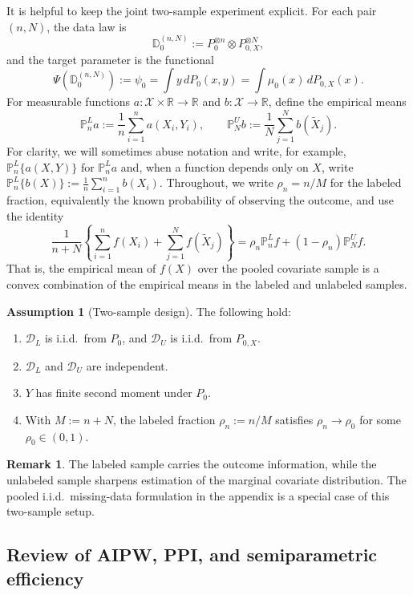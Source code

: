 \documentclass{article}
\theoremstyle{plain}
\theoremstyle{definition}
\newtheorem{remark}{Remark}
\newtheorem{assumption}{Assumption}
\newcommand{\R}{\mathbb{R}}
\newcommand{\1}{\mathbbm{1}}
\newcommand{\rhozero}{\rho_0}
\newcommand{\rhon}{\rho_n}
\newcommand{\muzero}{\mu_0}
\newcommand{\Pl}{\mathbb{P}^{L}_n}
\newcommand{\Pu}{\mathbb{P}^{U}_N}
\newcommand{\Px}{P_{0,X}}
\begin{document}
It is helpful to keep the joint two-sample experiment explicit. For each pair \((n,N)\), the data law is
\[
\mathbb D_0^{(n,N)} := P_0^{\otimes n}\otimes \Px^{\otimes N},
\]
and the target parameter is the functional
\[
\Psi\left(\mathbb D_0^{(n,N)}\right)
:=
\psi_0
=
\int y\,dP_0(x,y)
=
\int \muzero(x)\,d\Px(x).
\]
For measurable functions \(a:\mathcal X\times \R \to \R\) and \(b:\mathcal X \to \R\), define the empirical means
\[
\Pl a := \frac{1}{n}\sum_{i=1}^n a(X_i,Y_i),
\qquad
\Pu b := \frac{1}{N}\sum_{j=1}^N b(\widetilde X_j).
\]
For clarity, we will sometimes abuse notation and write, for example, \(\Pl\{a(X,Y)\}\) for \(\Pl a\) and, when a function depends only on \(X\), write \(\Pl \{b(X)\} := \frac{1}{n}\sum_{i=1}^n b(X_i)\).
Throughout, we write \(\rho_n = n/M\) for the labeled fraction, equivalently the known probability of observing the outcome, and use the identity
\[
\frac{1}{n+N}\left\{\sum_{i=1}^n f(X_i) + \sum_{j=1}^N f(\widetilde X_j)\right\}
=
\rho_n \Pl f + (1-\rho_n)\Pu f.
\]
That is, the empirical mean of \(f(X)\) over the pooled covariate sample is a convex combination of the empirical means in the labeled and unlabeled samples.

 


\begin{assumption}[Two-sample design]
\label{assump:design}
The following hold:
\begin{enumerate}[leftmargin=6mm,label=(\roman*)]
\item \(\mathcal D_L\) is i.i.d.\ from \(P_0\), and \(\mathcal D_U\) is i.i.d.\ from \(\Px\).
\item \(\mathcal D_L\) and \(\mathcal D_U\) are independent.
\item \(Y\) has finite second moment under \(P_0\).
\item With \(M:=n+N\), the labeled fraction \(\rhon:=n/M\) satisfies \(\rhon \to \rhozero\) for some \(\rhozero \in (0,1)\).
\end{enumerate}
\end{assumption}

\begin{remark}
The labeled sample carries the outcome information, while the unlabeled sample sharpens estimation of the marginal covariate distribution. The pooled i.i.d.\ missing-data formulation in the appendix is a special case of this two-sample setup. 
\end{remark}


\subsection{Review of AIPW, PPI, and semiparametric efficiency}
\label{sec:effreview}
\end{document}
